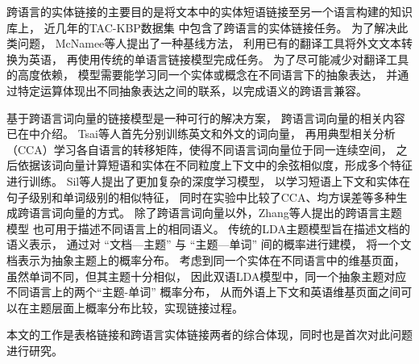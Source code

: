 跨语言的实体链接的主要目的是将文本中的实体短语链接至另一个语言构建的知识库上，
近几年的TAC-KBP数据集\cite{ji2010overview,cano2014microposts2014,carmel2014erd}
中包含了跨语言的实体链接任务。
为了解决此类问题，%
McNamee等人\cite{mcnamee2011cross}提出了一种基线方法，
利用已有的翻译工具将外文文本转换为英语，
再使用传统的单语言链接模型完成任务。
为了尽可能减少对翻译工具的高度依赖，
模型需要能学习同一个实体或概念在不同语言下的抽象表达，
并通过特定运算体现出不同抽象表达之间的联系，以完成语义的跨语言兼容。

基于跨语言词向量的链接模型是一种可行的解决方案，
跨语言词向量的相关内容已在中介绍。
Tsai等人\cite{tsai2016cross}首先分别训练英文和外文的词向量，
再用典型相关分析（CCA）学习各自语言的转移矩阵，使得不同语言词向量位于同一连续空间，
之后依据该词向量计算短语和实体在不同粒度上下文中的余弦相似度，形成多个特征进行训练。
Sil等人\cite{sil2017neural}提出了更加复杂的深度学习模型，
以学习短语上下文和实体在句子级别和单词级别的相似特征，
同时在实验中比较了CCA、均方误差等多种生成跨语言词向量的方式。
除了跨语言词向量以外，Zhang等人提出的跨语言主题模型\cite{zhang2013cross}
也可用于描述不同语言上的相同语义。
传统的LDA主题模型\cite{blei2003latent}旨在描述文档的语义表示，
通过对 ``{文档—主题}'' 与 ``{主题—单词}'' 间的概率进行建模，
将一个文档表示为抽象主题上的概率分布。
考虑到同一个实体在不同语言中的维基页面，
虽然单词不同，但其主题十分相似，
因此双语LDA模型中，同一个抽象主题对应不同语言上的两个``{主题-单词}'' 概率分布，
从而外语上下文和英语维基页面之间可以在主题层面上概率分布比较，实现链接过程。


本文的工作是表格链接和跨语言实体链接两者的综合体现，同时也是首次对此问题进行研究。
